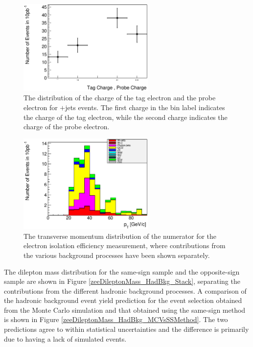 \documentclass{cmspaper}
\begin{document}
\begin{figure}[htb]
  \begin{center}
    \includegraphics[width=0.6\textwidth]{plots/WenuChargeCorrelation_TagAndProbe.eps} 
    \caption{The distribution of the charge of the tag electron and the probe electron for \W\To\E\Nu$+$jets events. The first charge in the bin label indicates the charge of the tag electron, while the second charge indicates the charge of the probe electron. }
    \label{fig:WenuChargeCorrelation_TagAndProbe}
  \end{center}
\end{figure}

\begin{figure}[htb]
  \begin{center}
    \includegraphics[width=0.6\textwidth]{plots/Efficiency_Isolation_Numerator_Stack_mcBkg_Pt.eps} 
    \caption{The transverse momentum distribution of the numerator for the electron isolation efficiency measurement, where contributions from the various background processes have been shown separately. }
    \label{fig:TagAndProbeElectronEfficiency_Isolation_Numerator_Stack_mcBkg_Pt}
  \end{center}
\end{figure}

The dilepton mass distribution for the same-sign sample and the opposite-sign sample are shown in Figure \ref{zeeDileptonMass_HadBkg_Stack}, separating the contributions from the different hadronic background processes. A comparison of the hadronic background event yield prediction for the \Z\To\Ep\Em event selection obtained from the Monte Carlo simulation and that obtained using the same-sign method is shown in Figure \ref{zeeDileptonMass_HadBkg_MCVsSSMethod}. The two predictions agree to within statistical uncertainties and the difference is primarily due to having a lack of simulated events.
\end{document}
